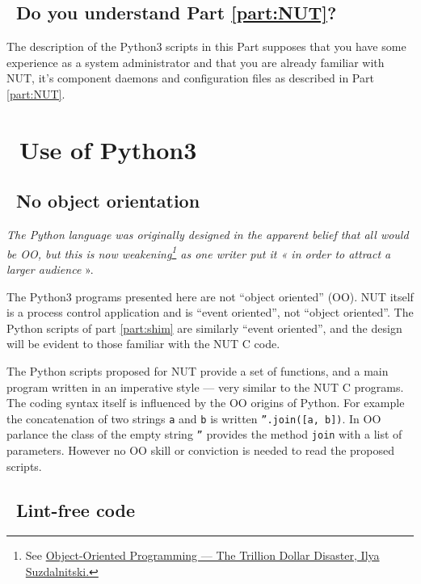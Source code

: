 \documentclass[12pt]{article}
\newlength{\headersep}\setlength{\headersep}{3mm}
\newcommand{\Hsep}{\hspace{\headersep}}
\begin{document}
\subsection{\Hsep\ Do you understand Part \ref{part:NUT}?}\label{section:pyIntro1}

The description of the Python3 scripts in this Part supposes that you have
some experience as a system administrator and that you are already familiar
with NUT, it's component daemons and configuration files as described in Part
\ref{part:NUT}.

\section{\Hsep\ Use of Python3}\label{section:pyUse}

\subsection{\Hsep\ No object orientation}\label{section:OO}

\textit{The Python language was originally designed in the apparent
belief that all would be OO, but this is now weakening\footnote{ See
  \href{https://medium.com/better-programming/object-oriented-programming-the-trillion-dollar-disaster-92a4b666c7c7}%
       {Object-Oriented Programming — The Trillion Dollar Disaster, Ilya
         Suzdalnitski.}}  as one writer put it « in order to attract a
    larger audience} ».

The Python3 programs presented here are not ``object oriented'' (OO).  NUT
itself is a process control application and is ``event oriented'', not
``object oriented''.  The Python scripts of part \ref{part:shim} are
similarly ``event oriented'', and the design will be evident to those
familiar with the NUT C code.  

The Python scripts proposed for NUT provide a set of functions, and a main
program written in an imperative style --- very similar to the NUT C programs.
The coding syntax itself is influenced by the OO origins of Python.  For
example the concatenation of two strings \texttt{a} and \texttt{b} is written
\texttt{''.join([a, b])}.  In OO parlance the class of the empty string
\texttt{''} provides the method \texttt{join} with a list of parameters.
However no OO skill or conviction is needed to read the proposed scripts.

\subsection{\Hsep\ Lint-free code}\label{section:lint}
\end{document}
